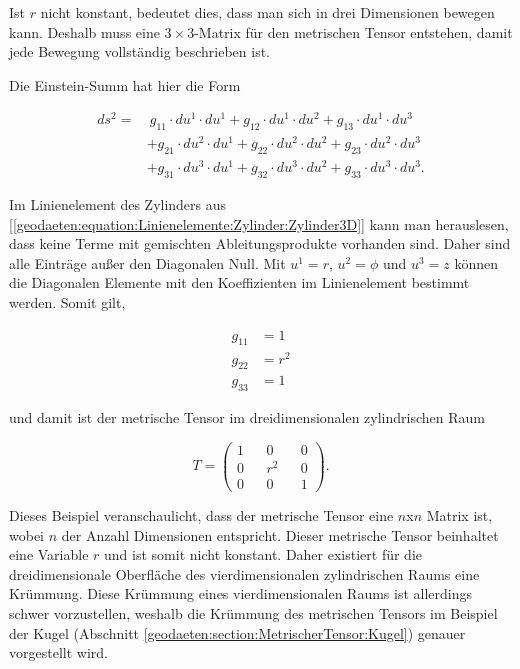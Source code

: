 Ist $r$ nicht konstant, bedeutet dies, dass man sich in drei Dimensionen bewegen kann.
Deshalb muss eine $3 \times 3$-Matrix für den metrischen Tensor entstehen, damit jede Bewegung vollständig beschrieben ist. 

Die Einstein-Summ hat hier die Form

\begin{equation}
\begin{align}
	ds^2 = &\ g_{11} \cdot du^1 \cdot du^1 + g_{12} \cdot du^1 \cdot du^2 + g_{13} \cdot du^1 \cdot du^3 \nonumber \\
	&+ g_{21} \cdot du^2 \cdot du^1 + g_{22} \cdot du^2 \cdot du^2 + g_{23} \cdot du^2 \cdot du^3 \nonumber \\
	&+ g_{31} \cdot du^3 \cdot du^1 + g_{32} \cdot du^3 \cdot du^2 + g_{33} \cdot du^3 \cdot du^3  .
\end{align} 
	\label{geodaeten:equation:MetrischerTensor:Kartesisch:EinsteinSumme3D}
\end{equation}

Im Linienelement des Zylinders aus [\ref{geodaeten:equation:Linienelemente:Zylinder:Zylinder3D}] kann man herauslesen, dass keine Terme mit gemischten Ableitungsprodukte vorhanden sind.
Daher sind alle Einträge außer den Diagonalen Null.
Mit $u^1 = r$, $u^2 = \phi$ und $u^3 = z$  können die Diagonalen Elemente mit den Koeffizienten im Linienelement bestimmt werden. 
Somit gilt,

\begin{equation}
	\begin{aligned}
		g_{11}  &= 1  \\
		g_{22}  &= r^2 \\
		g_{33}  &= 1  
	\end{aligned}
\end{equation}

und damit ist der metrische Tensor im dreidimensionalen zylindrischen Raum

\begin{equation}
	T = \begin{pmatrix} 1 && 0 && 0 \\ 0 && r^2 && 0 \\ 0 && 0 && 1 \end{pmatrix} .
\end{equation}

Dieses Beispiel veranschaulicht, dass der metrische Tensor eine $n$x$n$ Matrix ist, wobei $n$ der Anzahl Dimensionen entspricht.
Dieser metrische Tensor beinhaltet eine Variable $r$ und ist somit nicht konstant. 
Daher existiert für die dreidimensionale Oberfläche des vierdimensionalen zylindrischen Raums eine Krümmung.
Diese Krümmung eines vierdimensionalen Raums ist allerdings schwer vorzustellen, weshalb die Krümmung des metrischen Tensors im Beispiel der Kugel (Abschnitt \ref{geodaeten:section:MetrischerTensor:Kugel}) genauer vorgestellt wird.
